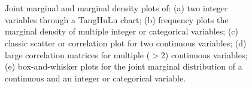 \documentclass{bioinfo}
\begin{document}
\begin{figure}[ht]
 \\
 \\
\caption{Joint marginal and marginal density plots of: (a) two integer variables through a TangHuLu chart; (b) frequency plots the marginal density of multiple integer or categorical variables; (c) classic scatter or correlation plot for two continuous variables; (d) large correlation matrices for multiple ($> 2$) continuous variables; (e) box-and-whisker plots for the joint marginal distribution of a continuous and an integer or categorical variable.}
\label{fig:4tabs}
\end{figure}
\end{document}
